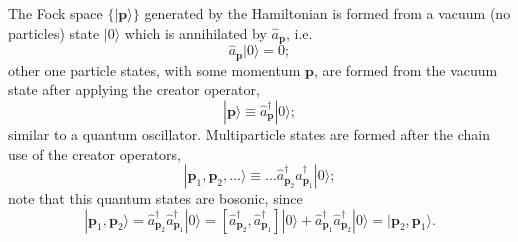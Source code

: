 The Fock space $\{|\mathbf{p}\rangle\}$ generated by the Hamiltonian is formed from a vacuum (no particles) state $|0\rangle$ which is annihilated by $\hat{a}_\mathbf{p}$, i.e.
\begin{equation}
	\hat{a}_\mathbf{p}|0\rangle=0;
\end{equation}
other one particle states, with some momentum $\mathbf{p}$, are formed from the vacuum state after applying the creator operator,
\begin{equation}
	|\mathbf{p}\rangle\equiv \hat{a}^\dagger_{\mathbf{p}}|0\rangle;
\end{equation}
similar to a quantum oscillator. Multiparticle states are formed after the chain use of the creator operators,
\begin{equation}
	|\mathbf{p}_1,\mathbf{p}_2,\hdots\rangle\equiv \hdots \hat{a}^\dagger_{\mathbf{p}_2}\hat{a}^\dagger_{\mathbf{p}_1}|0\rangle;
\end{equation}
note that this quantum states are bosonic, since
\begin{equation}
	|\mathbf{p}_1,\mathbf{p}_2\rangle=\hat{a}^\dagger_{\mathbf{p}_2}\hat{a}^\dagger_{\mathbf{p}_1}|0\rangle=\left[\hat{a}^\dagger_{\mathbf{p}_2},\hat{a}^\dagger_{\mathbf{p}_1}\right]|0\rangle+\hat{a}^\dagger_{\mathbf{p}_1}\hat{a}^\dagger_{\mathbf{p}_2}|0\rangle=|\mathbf{p}_2,\mathbf{p}_1\rangle.
\end{equation}